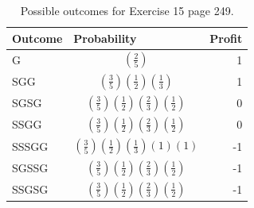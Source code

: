 \documentclass[10pt,leter,openany]{article}
\begin{document}
	\begin{table}[]
		\centering
		\caption{Possible outcomes for Exercise 15 page 249.}
		\label{tab:ex15p247}
		\begin{tabular}{@{}lcr@{}}
			\toprule
			\textbf{Outcome} & \multicolumn{1}{l}{\textbf{Probability}} & \multicolumn{1}{l}{\textbf{Profit}} \\ \midrule \vspace{0.3cm} 
			G                &$  \left(  \frac{2}{5}       \right)       $                          & 1                                   \\ \vspace{0.3cm} 
			SGG              & $\left( \frac{3}{5}\right) \left( \frac{1}{2}\right) \left( \frac{1}{3}\right) $                                                 & 1                                   \\ \vspace{0.3cm} 
			SGSG             & $\left( \frac{3}{5}\right) \left( \frac{1}{2}\right) \left( \frac{2}{3}\right) \left( \frac{1}{2}\right) $                                         & 0                                   \\ \vspace{0.3cm} 
			SSGG             & $\left( \frac{3}{5}\right) \left( \frac{1}{2}\right) \left( \frac{2}{3}\right) \left( \frac{1}{2}\right) $                                         & 0                                   \\ \vspace{0.3cm} 
			SSSGG            & $\left( \frac{3}{5}\right) \left( \frac{1}{2}\right) \left( \frac{1}{3}\right) \left( 1\right) \left( 1\right) $                                        & -1                                  \\ \vspace{0.3cm} 
			SGSSG            & $\left( \frac{3}{5}\right) \left( \frac{1}{2}\right) \left( \frac{2}{3}\right) \left( \frac{1}{2}\right) $                                       & -1                                  \\ \vspace{0.3cm} 
			SSGSG            & $\left( \frac{3}{5}\right) \left( \frac{1}{2}\right) \left( \frac{2}{3}\right) \left( \frac{1}{2}\right) $                                        & -1                                  \\ \bottomrule
		\end{tabular}
	\end{table}
	
\end{document}
